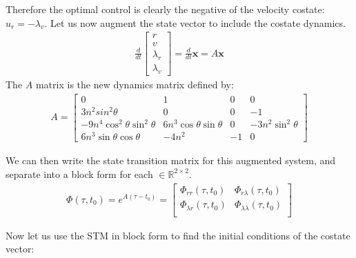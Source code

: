 \documentclass[conf]{new-aiaa}
\begin{document}
\begin{singlespace}
Therefore the optimal control is clearly the negative of the velocity costate: $u_r = -\lambda_v$. Let us now augment the state vector to include the costate dynamics.
\begin{align}
    \frac{d}{dt}
    \begin{bmatrix}
        r \\ v \\ \lambda_r \\ \lambda_v
    \end{bmatrix}
    = \frac{d}{dt} \bm{x} = A\bm{x}
\end{align}
The $A$ matrix is the new dynamics matrix defined by:
\begin{align}
    A = 
    \begin{bmatrix}
        0 & 1 & 0 & 0 \\
        3n^2sin^2\theta & 0 & 0 & -1 \\
        -9n^4\cos^2\theta\sin^2\theta & 6n^3\cos\theta\sin\theta & 0 & - 3n^2\sin^2\theta \\
        6n^3\sin\theta \cos\theta & -4n^2 & -1 & 0
    \end{bmatrix}
\end{align}

We can then write the state transition matrix for this augmented system, and separate into a block form for each $\in \mathbb{R}^{2\times 2}$.
\begin{align}
    \Phi(\tau,t_0) = e^{A(\tau-t_0)} =
    \begin{bmatrix}
        \Phi_{rr}(\tau,t_0) & \Phi_{r\lambda}(\tau,t_0) \\
        \Phi_{\lambda r}(\tau,t_0) & \Phi_{\lambda\lambda}(\tau,t_0) \\
    \end{bmatrix}
\end{align}

Now let us use the STM in block form to find the initial conditions of the costate vector:


\end{singlespace}
\end{document}
